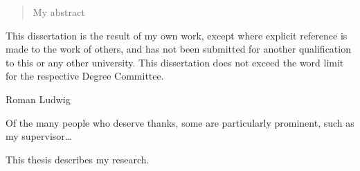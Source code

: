 
\begin{abstract}%
  My abstract
\end{abstract}


\begin{declaration}
  This dissertation is the result of my own work, except where explicit
  reference is made to the work of others, and has not been submitted
  for another qualification to this or any other university. This
  dissertation does not exceed the word limit for the respective Degree
  Committee.
  \vspace*{1cm}
  \begin{flushright}
    Roman Ludwig
  \end{flushright}
\end{declaration}


\begin{acknowledgements}
  Of the many people who deserve thanks, some are particularly prominent,
  such as my supervisor\dots
\end{acknowledgements}


\begin{preface}
  This thesis describes my research.
\end{preface}

\tableofcontents


\thispagestyle{empty}
